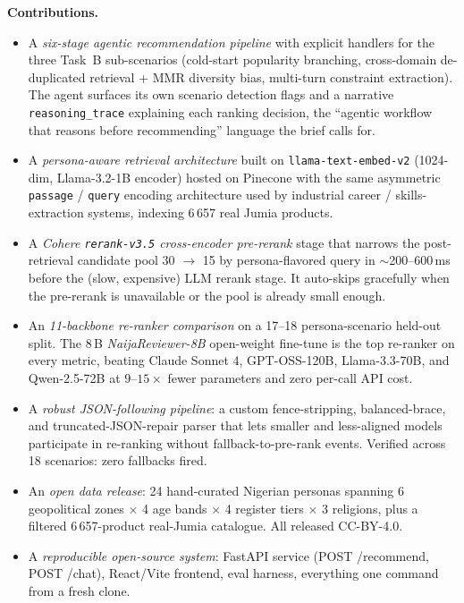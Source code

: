 \documentclass[sigconf,nonacm,balance]{acmart}
\begin{document}
\textbf{Contributions.}
\begin{itemize}[leftmargin=*]
    \item A \emph{six-stage agentic recommendation pipeline} with explicit
          handlers for the three Task~B sub-scenarios (cold-start
          popularity branching, cross-domain de-duplicated retrieval +
          MMR diversity bias, multi-turn constraint extraction). The
          agent surfaces its own scenario detection flags and a
          narrative \texttt{reasoning\_trace} explaining each
          ranking decision, the ``agentic workflow that reasons
          before recommending'' language the brief calls for.
    \item A \emph{persona-aware retrieval architecture} built on
          \texttt{llama-text-embed-v2} (1024-dim, Llama-3.2-1B encoder)
          hosted on Pinecone with the same asymmetric
          \texttt{passage} / \texttt{query} encoding architecture used
          by industrial career / skills-extraction systems, indexing
          6\,657 real Jumia products.
    \item A \emph{Cohere \texttt{rerank-v3.5} cross-encoder pre-rerank}
          stage that narrows the post-retrieval candidate pool 30 $\to$ 15
          by persona-flavored query in $\sim$200--600\,ms before the
          (slow, expensive) LLM rerank stage. It auto-skips gracefully when
          the pre-rerank is unavailable or the pool is already small enough.
    \item An \emph{11-backbone re-ranker comparison} on a 17--18
          persona-scenario held-out split. The 8\,B \emph{NaijaReviewer-8B}
          open-weight fine-tune is the top re-ranker on every metric,
          beating Claude Sonnet 4, GPT-OSS-120B, Llama-3.3-70B, and
          Qwen-2.5-72B at $9$--$15\times$ fewer parameters and zero
          per-call API cost.
    \item A \emph{robust JSON-following pipeline}: a custom
          fence-stripping, balanced-brace, and truncated-JSON-repair parser
          that lets smaller and
          less-aligned models participate in re-ranking without
          fallback-to-pre-rank events. Verified across 18 scenarios:
          zero fallbacks fired.
    \item An \emph{open data release}: 24 hand-curated Nigerian personas
          spanning 6 geopolitical zones $\times$ 4 age bands $\times$ 4
          register tiers $\times$ 3 religions, plus a filtered
          6\,657-product real-Jumia catalogue. All released CC-BY-4.0.
    \item A \emph{reproducible open-source system}: FastAPI service
          (POST /recommend, POST /chat), React/Vite frontend, eval
          harness,  everything one command from a fresh clone.
\end{itemize}
\end{document}
